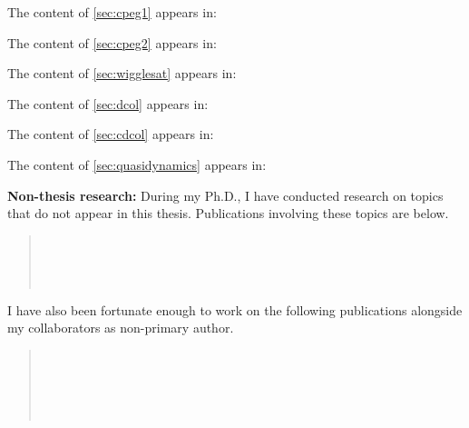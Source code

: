 \noindent The content of \cref{sec:cpeg1} appears in:
\vspace{5mm}

\noindent The content of \cref{sec:cpeg2} appears in:
\vspace{5mm}

\noindent The content of \cref{sec:wigglesat} appears in:
\vspace{5mm}

\noindent The content of \cref{sec:dcol} appears in:
\vspace{5mm}

\noindent The content of \cref{sec:cdcol} appears in:
\vspace{5mm}

\noindent The content of \cref{sec:quasidynamics} appears in:
\vspace{5mm}

\noindent
\textbf{Non-thesis research:}
During my Ph.D., I have conducted research on topics that do not appear in this thesis. Publications involving these topics are below. 

\begin{leftbar}
\begin{quote}%
  \citep{tracy2020}  \\[5mm]
  \citep{tracy2021}  \\[5mm]
  \citep{tracy2022f}  \\[5mm]
  \citep{tracy2022}  
\end{quote}
\end{leftbar}

\vspace{7mm}
\noindent
I have also been fortunate enough to work on the following publications alongside my collaborators as non-primary author.

\begin{leftbar}
\begin{quote}%
   \\[5mm]
   \\[5mm]
   \\[5mm]
   \\[5mm]
\end{quote}
\end{leftbar}



